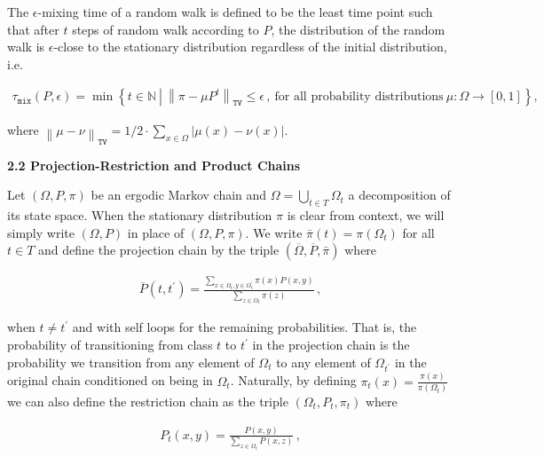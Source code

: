 The $\epsilon$-mixing time of a random walk is defined to be the least time point such that after $t$ steps of random walk according to $P$, the distribution of the random walk is $\epsilon$-close to the stationary distribution regardless of the initial distribution, i.e.\par


\[\begin{gathered}
\tau_{\mathtt{mix}}(P,\epsilon)=\min\left\{t\in\mathbb{N}~\left|~\left\|\pi-\mu P^{t}\right\|_{\mathtt{TV}}\leq\epsilon\,,~\textrm{for all probability distributions}~\mu:\Omega\to[0,1]\right.\right\},
\end{gathered}\]


where $\left\|\mu-\nu\right\|_{\mathtt{TV}}=1/2\cdot\sum_{x\in\Omega}|\mu(x)-\nu(x)|$.\par





\par\medskip\noindent\textbf{2.2 Projection-Restriction and Product Chains}\par




Let $(\Omega,P,\pi)$ be an ergodic Markov chain and $\Omega=\bigcup_{t\in T}\Omega_{t}$ a decomposition of its state space. When the stationary distribution $\pi$ is clear from context, we will simply write $(\Omega,P)$ in place of $(\Omega,P,\pi)$. We write $\bar{\pi}(t)=\pi(\Omega_{t})$ for all $t\in T$ and define the projection chain by the triple $(\overline{\Omega},\overline{P},\bar{\pi})$ where\par


\[\begin{gathered}
\overline{P}(t,t^{\prime})=\frac{\sum_{x\in\Omega_{t},y\in\Omega_{t}^{\prime}}\pi(x)P(x,y)}{\sum_{z\in\Omega_{t}}\pi(z)}\,,
\end{gathered}\]


when $t\neq t^{\prime}$ and with self loops for the remaining probabilities.
That is, the probability of transitioning from class $t$ to $t^{\prime}$ in the projection chain is the probability we transition from any element of $\Omega_{t}$ to any element of $\Omega_{t^{\prime}}$ in the original chain conditioned on being in $\Omega_{t}$. Naturally, by defining
$\pi_{t}(x)=\frac{\pi(x)}{\pi(\Omega_{t})}$
we can also define the restriction chain as the triple $(\Omega_{t},P_{t},\pi_{t})$ where\par


\[\begin{gathered}
P_{t}(x,y)=\frac{P(x,y)}{\sum_{z\in\Omega_{t}}P(x,z)}\,,
\end{gathered}\]


